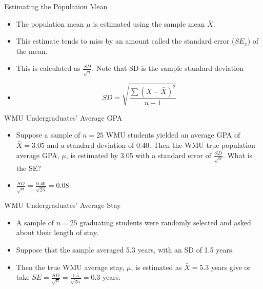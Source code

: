 \documentclass[14pt]{beamer}\usepackage[]{graphicx}\usepackage[]{color}
\begin{document}
\begin{frame}[fragile]{Estimating the Population Mean}

\begin{itemize}
\item The population mean $\mu$ is estimated using the sample mean $\bar{X}$.  \item This  estimate tends to miss by an amount called the standard error ($SE_{\bar{x}}$) of
the mean. 
\item This is calculated as $\frac{SD}{\sqrt{n}}$.  Note that SD is the sample standard deviation 
\item
\begin{equation*}
  SD = \sqrt{ \frac{\sum (X - \bar{X})^2 }{n - 1}}
\end{equation*}
\end{itemize}

\end{frame}

\begin{frame}[fragile]{WMU Undergraduates' Average GPA}

\begin{itemize}
\item<1-> Suppose a sample of $n = 25$ WMU students yielded an average GPA of $\bar{X} = 3.05$ and a standard deviation of 0.40. Then the WMU true population average GPA, $\mu$, is estimated by 3.05 with a standard error of $\frac{SD}{\sqrt{n}}$.  What is the SE? 
\item<2-> $\frac{SD}{\sqrt{n}} = \frac{0.40}{\sqrt{25}} = 0.08$
\end{itemize}
\end{frame}

\begin{frame}[fragile]{WMU Undergraduates' Average Stay}

\begin{itemize}
\item<1-> A sample of $n = 25$ graduating students were randomly selected and  asked about their length of stay. 
\item<2-> Suppose that the sample averaged 5.3 years, with an SD of 1.5 years. \item<3-> Then the true WMU average stay, $\mu$, is estimated as $\bar{X} = 5.3$ years give or take $SE = \frac{SD}{\sqrt{n}} = \frac{1.5}{\sqrt{25}} = 0.3$ years.
\end{itemize}
\end{frame}
\end{document}
